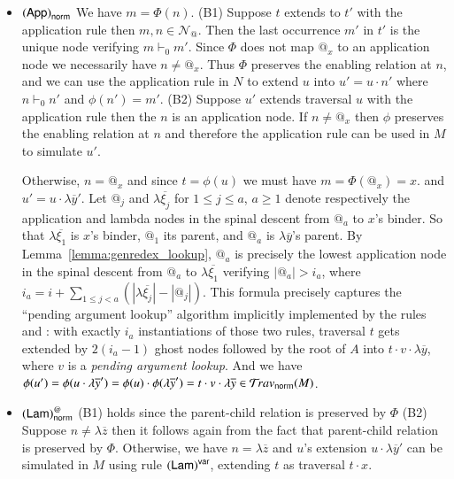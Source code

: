 \documentclass{elsarticle}
\makeatletter
\theoremstyle{plain}
\theoremstyle{definition}
\newcommand\Nodes{\mathcal{N}}%
\newcommand\NodesApp{\Nodes_@}%
\newcommand{\normalizing}{{\sf norm}}
\newcommand{\travsetnorm}{\travset_\normalizing} %
\newcommand{\enables}{\vdash} %
\makeatother
\begin{document}
\begin{itemize}[itemindent=0.5em, leftmargin=0.5em]
    \item $\rulename{App}_\normalizing$ We have $m = \Phi(n)$.
    (B1) Suppose $t$ extends to $t'$ with the application rule then $m, n \in\NodesApp$. Then the last occurrence $m'$ in $t'$ is the unique node verifying $m \enables_0 m'$.  Since $\Phi$ does not map $@_x$ to an application node we necessarily have  $n \neq @_x$. Thus $\Phi$ preserves the enabling relation at $n$, and we can use the application rule in $N$ to extend $u$ into $u' = u \cdot n'$ where $n \enables_0 n'$ and $\phi(n') = m'$.
    (B2) Suppose $u'$ extends traversal $u$ with the application rule then the $n$ is an application node.
    If $n\neq@_x$ then $\phi$ preserves the enabling relation at $n$ and therefore the application rule can be used in $M$ to simulate $u'$.

    Otherwise, $n=@_x$ and since $t = \phi(u)$ we must have $m = \Phi(@_x) = x$.
    and $u' = u \cdot \lambda\overline{y}'$.
    Let $@_j$ and $\lambda\overline{\xi_j}$ for $1\leq j\leq a$, $a\geq 1$ denote respectively the application and lambda nodes in the spinal descent
    from $@_a$ to $x$'s binder. So that $\lambda\overline{\xi_1}$ is $x$'s binder, $@_1$ its parent,  and $@_a$ is $\lambda\overline{y}$'s parent.
    By Lemma~\ref{lemma:genredex_lookup}, $@_a$ is precisely the lowest application node in the spinal descent
    from $@_a$ to $\lambda\overline{\xi_1}$ verifying $|@_a| >  i_a$,
        where $i_a = i + \sum_{1\leq j< a} (|\lambda\overline{\xi_j}| - |@_j|)$.
    This formula precisely captures the ``pending argument lookup'' algorithm implicitly
    implemented by the rules  and :
    with exactly $i_a$ instantiations of those two rules, traversal $t$ gets extended by $2(i_a-1)$ ghost nodes followed
    by the root of $A$ into $t \cdot v \cdot \lambda\overline{y}$,
    where  $v$ is a \emph{pending argument lookup}.
    And we have $\phi(u')
    = \phi(u \cdot \lambda\overline{y}')
    = \phi(u) \cdot \phi(\lambda\overline{y}')
    = t \cdot v \cdot \lambda\overline{y} \in \travsetnorm(M)$.

    \item $\rulename{Lam}^@_\normalizing$
    (B1) holds since the parent-child relation is preserved by $\Phi$
    (B2) Suppose $n \neq \lambda\overline{z}$ then it follows again from the fact that parent-child relation is preserved by $\Phi$.
    Otherwise, we have $n = \lambda\overline{z}$ and $u$'s extension $u \cdot \lambda\overline{y}'$ can be simulated in $M$ using rule $\mathbf{({\sf Lam})}^{\sf var}$, extending $t$ as traversal $t \cdot x$.


\end{itemize}
\end{document}
